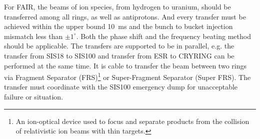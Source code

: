For FAIR, the beams of ion species, from hydrogen to uranium, should be transferred among all rings, as well as antiprotons. And every transfer must be achieved within the upper bound \SI{10}{ms} and the bunch to bucket injection mismatch less than $\pm1^\circ$. Both the phase shift and the frequency beating method should be applicable. The transfers are supported to be in parallel, e.g. the transfer from SIS18 to SIS100 and transfer from ESR to CRYRING can be performed at the same time. It is cable to transfer the beam between two rings via Fragment Separator (\gls{FRS})\footnote{An ion-optical device used to focus and separate products from the collision of relativistic ion beams with thin targets.} or Super-Fragment Separator (Super FRS). The transfer must coordinate with the SIS100 emergency dump for unacceptable failure or situation. 


